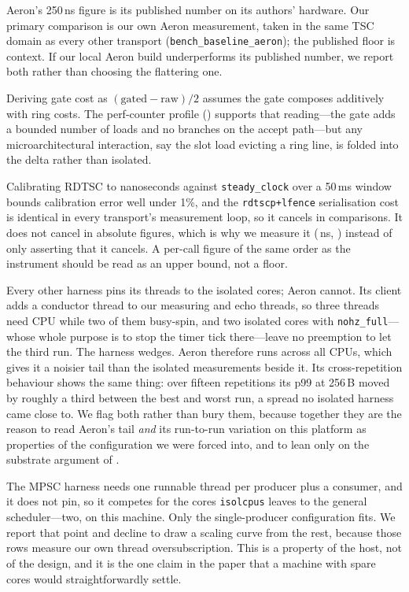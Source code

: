  Aeron's 250\,ns figure is its published
number on its authors' hardware. Our primary comparison is our own
Aeron measurement, taken in the same TSC domain as every other
transport (\texttt{bench\_baseline\_aeron}); the published floor is
context. If our local Aeron build underperforms its published number,
we report both rather than choosing the flattering one.

 Deriving gate cost as
$(\text{gated}-\text{raw})/2$ assumes the gate composes additively
with ring costs. The perf-counter profile
() supports that reading---the gate adds a
bounded number of loads and no branches on the accept path---but any
microarchitectural interaction, say the slot load evicting a ring
line, is folded into the delta rather than isolated.

 Calibrating RDTSC to nanoseconds against
\texttt{steady\_clock} over a 50\,ms window bounds calibration error
well under 1\%, and the \texttt{rdtscp+lfence} serialisation cost is
identical in every transport's measurement loop, so it cancels in
comparisons. It does not cancel in absolute figures, which is why we
measure it (\timerFloor\,ns, ) instead of only
asserting that it cancels. A per-call figure of the same order as the
instrument should be read as an upper bound, not a floor.

 Every other harness pins its
threads to the isolated cores; Aeron cannot. Its client adds a
conductor thread to our measuring and echo threads, so three threads
need CPU while two of them busy-spin, and two isolated cores with
\texttt{nohz\_full}---whose whole purpose is to stop the timer tick
there---leave no preemption to let the third run. The harness wedges.
Aeron therefore runs across all CPUs, which gives it a noisier tail
than the isolated measurements beside it. Its cross-repetition
behaviour shows the same thing: over fifteen repetitions its p99 at
256\,B moved by roughly a third between the best and worst run, a
spread no isolated harness came close to. We flag both rather than
bury them, because together they are the reason to read Aeron's tail
\emph{and} its run-to-run variation on this platform as properties of
the configuration we were forced into, and to lean only on the
substrate argument of .

 The MPSC harness needs one runnable
thread per producer plus a consumer, and it does not pin, so it competes
for the cores \texttt{isolcpus} leaves to the general scheduler---two,
on this machine. Only the single-producer configuration fits. We report
that point and decline to draw a scaling curve from the rest, because
those rows measure our own thread oversubscription. This is a property
of the host, not of the design, and it is the one claim in the paper
that a machine with spare cores would straightforwardly settle.

